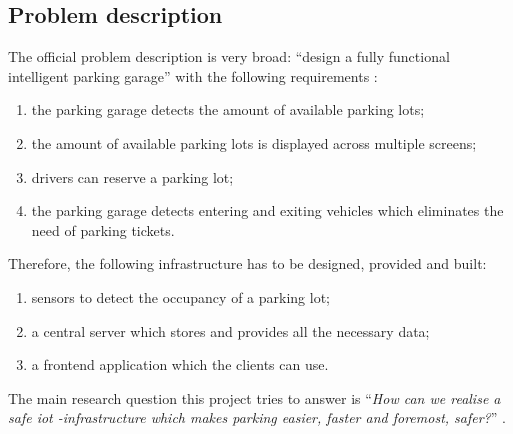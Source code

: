 
\subsection{Problem description}\label{sec:Problem description}
The official problem description is very broad: ``design a fully functional intelligent parking garage'' with the following requirements \cite{project_description}:
\begin{enumerate}
    \item the parking garage detects the amount of available parking lots;
    \item the amount of available parking lots is displayed across multiple screens;
    \item drivers can reserve a parking lot;
    \item the parking garage detects entering and exiting vehicles which eliminates the need of parking tickets.
\end{enumerate}
Therefore, the following infrastructure has to be designed, provided and built:
\begin{enumerate}
    \item sensors to detect the occupancy of a parking lot;
    \item a central server which stores and provides all the necessary data;
    \item a frontend application which the clients can use.
\end{enumerate}
The main research question this project tries to answer is ``\textit{How can we realise a safe \ac{iot} -infrastructure which makes parking easier, faster and foremost, safer?}'' \cite{project_description}.